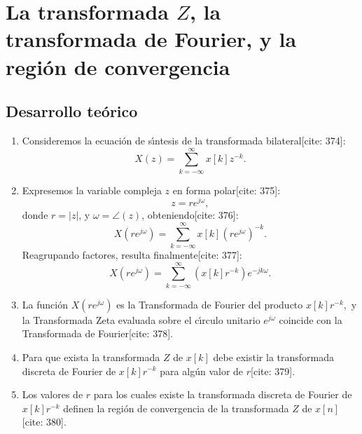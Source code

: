 \documentclass[11pt,a4paper,openany]{book}
\begin{document}
\section{La transformada $Z$, la transformada de Fourier, y la regi\'{o}n de convergencia} \label{zetaconv}

\subsection{Desarrollo te\'{o}rico}

\begin{enumerate}
	\item Consideremos la ecuaci\'{o}n de s\'{\i}ntesis de la transformada bilateral[cite: 374]:
	\begin{equation}
		X(z) = \sum_{k=-\infty}^{\infty} x[k] z^{-k}.
	\end{equation}
	
	\item Expresemos la variable compleja $z$ en forma polar[cite: 375]:
	\begin{equation}
		z = r e^{j \omega},
	\end{equation}
	donde $r = |z|$, y $\omega = \angle(z)$, obteniendo[cite: 376]:
	\begin{equation}
		X(r e^{j \omega}) = \sum_{k=-\infty}^{\infty} x[k] (r e^{j \omega})^{-k}.
	\end{equation}
	Reagrupando factores, resulta finalmente[cite: 377]:
	\begin{equation}
		X(r e^{j \omega}) = \sum_{k=-\infty}^{\infty} \left( x[k] r^{-k} \right) e^{-j k \omega}.
	\end{equation}
	
	\item La funci\'{o}n $X(r e^{j \omega})$ es la Transformada de Fourier del producto $x[k] r^{-k},$ y la Transformada Zeta evaluada sobre el c\'{\i}rculo unitario $e^{j \omega}$ coincide con la Transformada de Fourier[cite: 378].
	\item Para que exista la transformada $Z$ de $x[k]$ debe existir la transformada discreta de Fourier de $x[k] r^{-k}$ para alg\'{u}n valor de $r$[cite: 379].
	\item Los valores de $r$ para los cuales existe la transformada discreta de Fourier de $x[k] r^{-k}$ definen la regi\'{o}n de convergencia de la transformada $Z$ de $x[n]$[cite: 380].
	

\end{enumerate}
\end{document}
